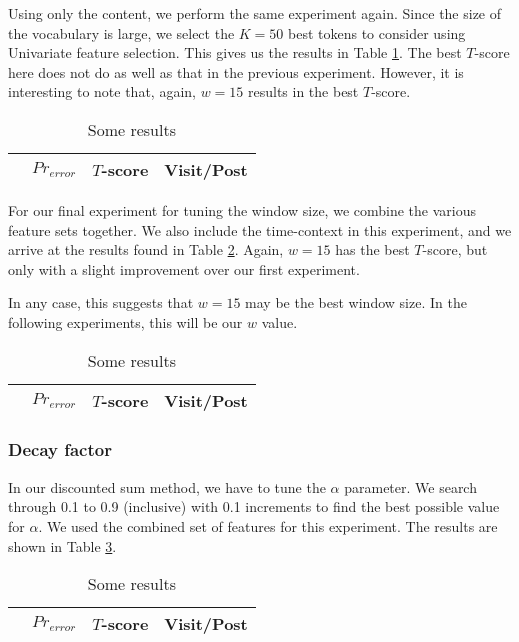 Using only the content, we perform the same experiment again. Since the size of 
the vocabulary is large, we select the $K = 50$ best tokens to consider using 
Univariate feature selection. This gives us the results in Table 
\ref{tbl:par_tune_content}. The best $T$-score here does not do as well as that 
in the previous experiment. However, it is interesting to note that, again, 
$w=15$ results in the best $T$-score.

\begin{table}
\begin{center}
\begin{tabular}{| l | c | c | c |}
\hline
		& $Pr_{error}$		  & $T$-score			   &	Visit/Post\\
\hline
	
\hline
\end{tabular}
\end{center}
\caption{Some results}\label{tbl:par_tune_content}
\end{table}

For our final experiment for tuning the window size, we combine the various 
feature sets together. We also include the time-context in this experiment, and 
we arrive at the results found in Table \ref{tbl:par_tune_comb}. Again, $w=15$ 
has the best $T$-score, but only with a slight improvement over our first 
experiment.

In any case, this suggests that $w=15$ may be the best window size. In the 
following experiments, this will be our $w$ value.

\begin{table}
\begin{center}
\begin{tabular}{| l | c | c | c |}
\hline
		& $Pr_{error}$		  & $T$-score			   &	Visit/Post\\
\hline
	
\hline
\end{tabular}
\end{center}
\caption{Some results}\label{tbl:par_tune_comb}
\end{table}


\subsubsection{Decay factor}
In our discounted sum method, we have to tune the $\alpha$ parameter. We search 
through 0.1 to 0.9 (inclusive) with 0.1 increments to find the best possible 
value for $\alpha$.  We used the combined set of features for this experiment.
The results are shown in Table \ref{tbl:par_tune_decay}.
\begin{table}
\begin{center}
\begin{tabular}{| l | c | c | c |}
\hline
		& $Pr_{error}$		  & $T$-score			   &	Visit/Post\\
\hline
	
\hline
\end{tabular}
\end{center}
\caption{Some results}\label{tbl:par_tune_decay}
\end{table}

